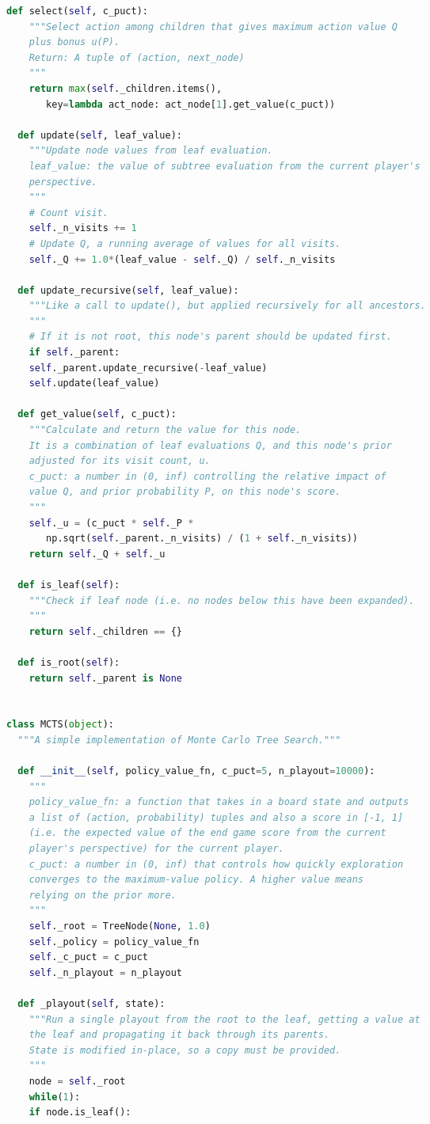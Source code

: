 \documentclass[a4paper]{article}
\begin{document}
\begin{multicols}{2}
\begin{lstlisting}[language=Python,breaklines = true,columns=flexible]
  def select(self, c_puct):
    """Select action among children that gives maximum action value Q
    plus bonus u(P).
    Return: A tuple of (action, next_node)
    """
    return max(self._children.items(),
       key=lambda act_node: act_node[1].get_value(c_puct))

  def update(self, leaf_value):
    """Update node values from leaf evaluation.
    leaf_value: the value of subtree evaluation from the current player's
    perspective.
    """
    # Count visit.
    self._n_visits += 1
    # Update Q, a running average of values for all visits.
    self._Q += 1.0*(leaf_value - self._Q) / self._n_visits

  def update_recursive(self, leaf_value):
    """Like a call to update(), but applied recursively for all ancestors.
    """
    # If it is not root, this node's parent should be updated first.
    if self._parent:
    self._parent.update_recursive(-leaf_value)
    self.update(leaf_value)

  def get_value(self, c_puct):
    """Calculate and return the value for this node.
    It is a combination of leaf evaluations Q, and this node's prior
    adjusted for its visit count, u.
    c_puct: a number in (0, inf) controlling the relative impact of
    value Q, and prior probability P, on this node's score.
    """
    self._u = (c_puct * self._P *
       np.sqrt(self._parent._n_visits) / (1 + self._n_visits))
    return self._Q + self._u

  def is_leaf(self):
    """Check if leaf node (i.e. no nodes below this have been expanded).
    """
    return self._children == {}

  def is_root(self):
    return self._parent is None


class MCTS(object):
  """A simple implementation of Monte Carlo Tree Search."""

  def __init__(self, policy_value_fn, c_puct=5, n_playout=10000):
    """
    policy_value_fn: a function that takes in a board state and outputs
    a list of (action, probability) tuples and also a score in [-1, 1]
    (i.e. the expected value of the end game score from the current
    player's perspective) for the current player.
    c_puct: a number in (0, inf) that controls how quickly exploration
    converges to the maximum-value policy. A higher value means
    relying on the prior more.
    """
    self._root = TreeNode(None, 1.0)
    self._policy = policy_value_fn
    self._c_puct = c_puct
    self._n_playout = n_playout

  def _playout(self, state):
    """Run a single playout from the root to the leaf, getting a value at
    the leaf and propagating it back through its parents.
    State is modified in-place, so a copy must be provided.
    """
    node = self._root
    while(1):
    if node.is_leaf():


\end{lstlisting}
\end{multicols}
\end{document}
